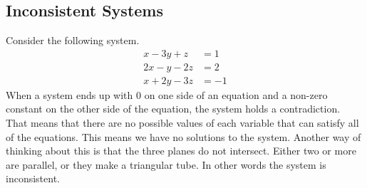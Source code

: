 \documentclass[12pt,fleqn]{book}
\begin{document}
\subsection*{Inconsistent Systems}
Consider the following system.
\begin{align*}
x-3y+z&=1\\
2x-y-2z&=2\\
x+2y-3z&=-1
\end{align*}
\vfill
When a system ends up with 0 on one side of an equation and a non-zero constant on the other side of the equation, the system holds a contradiction.  That means that there are no possible values of each variable that can satisfy all of the equations.  This means we have no solutions to the system.  Another way of thinking about this is that the three planes do not intersect.  Either two or more are parallel, or they make a triangular tube.  In other words the system is inconsistent.
\clearpage
\end{document}
